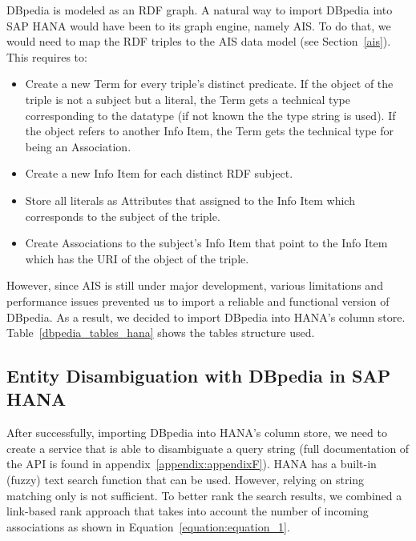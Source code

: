 DBpedia is modeled as an RDF graph. A natural way to import DBpedia into SAP HANA would have been to its graph engine, namely AIS. To do that, we would need to map the RDF triples to the AIS data model (see Section~\ref{ais}). This requires to:

\begin{itemize}
	\item Create a new Term for every triple's distinct predicate. If the object of the triple is not a subject but a literal, the Term gets a technical type corresponding to the datatype (if not known the the type string is used). If the object refers to another Info Item, the Term gets the technical type for being an Association.
	\item Create a new Info Item for each distinct RDF subject.
	\item Store all literals as Attributes that assigned to the Info Item which corresponds to the subject of the triple.
	\item Create Associations to the subject's Info Item that point to the Info Item which has the URI of the object of the triple.
\end{itemize}

However, since AIS is still under major development, various limitations and performance issues prevented us to import a reliable and functional version of DBpedia. As a result, we decided to import DBpedia into HANA's column store. Table~\ref{dbpedia_tables_hana} shows the tables structure used.

\subsection{Entity Disambiguation with DBpedia in SAP HANA}\label{section:disamigutation_HANA}

After successfully, importing DBpedia into HANA's column store, we need to create a service that is able to disambiguate a query string (full documentation of the API is found in appendix~\ref{appendix:appendixF}). HANA has a built-in (fuzzy) text search function that can be used. However, relying on string matching only is not sufficient. To better rank the search results, we combined a link-based rank approach that takes into account the number of incoming associations as shown in Equation~\ref{equation:equation_1}.


